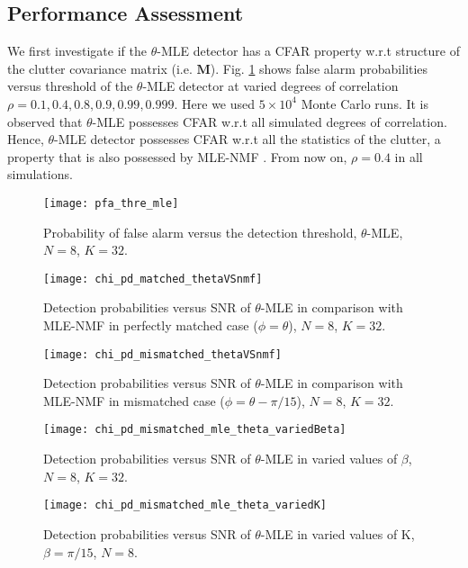 \subsection{Performance Assessment}
We first investigate if the $\theta$-MLE detector has a CFAR property
w.r.t structure of the clutter covariance matrix (i.e. $\boldsymbol{M}$).
Fig. \ref{pfa_thre_mle} shows false alarm probabilities versus threshold of
the $\theta$-MLE detector at varied degrees of correlation
$\rho = 0.1, 0.4, 0.8, 0.9, 0.99, 0.999$.
Here we used $5 \times 10^4$ Monte Carlo runs.
It is observed that $\theta$-MLE possesses CFAR w.r.t all simulated degrees of correlation.
Hence, $\theta$-MLE detector possesses CFAR w.r.t all the statistics of the clutter,
a property that is also possessed by MLE-NMF \cite{Conte_Aug02}.
From now on, $\rho = 0.4$ in all simulations.

 \begin{figure}
  \texttt{[image: pfa\_thre\_mle]}
  \caption{Probability of false alarm versus the detection threshold,
  $\theta$-MLE, $N = 8$, $K = 32$.}
  \label{pfa_thre_mle}
 \end{figure}


 \begin{figure}
  \texttt{[image: chi\_pd\_matched\_thetaVSnmf]}
  \caption{Detection probabilities versus SNR of $\theta$-MLE in comparison with MLE-NMF
   in perfectly matched case ($\phi = \theta$),
  $N = 8$, $K = 32$.}
  \label{pd_matched_thetaVSnmf}
 \end{figure}

  \begin{figure}
  \texttt{[image: chi\_pd\_mismatched\_thetaVSnmf]}
  \caption{Detection probabilities versus SNR of $\theta$-MLE in comparison with MLE-NMF
  in mismatched case ($\phi = \theta - \pi/15$), $N = 8$, $K = 32$.}
  \label{chi_pd_mismatched_thetaVSnmf}
 \end{figure}

  \begin{figure}
  \texttt{[image: chi\_pd\_mismatched\_mle\_theta\_variedBeta]}
  \caption{Detection probabilities versus SNR
  of $\theta$-MLE in varied values of $\beta$,
  $N = 8$, $K = 32$.}
  \label{chi_pd_mismatched_mle_theta_variedBeta}
   \end{figure}


  \begin{figure}
  \texttt{[image: chi\_pd\_mismatched\_mle\_theta\_variedK]}
  \caption{Detection probabilities versus SNR of $\theta$-MLE
  in varied values of K,
  $\beta = \pi/15$, $N = 8$.}
  \label{chi_pd_mismatched_scmAndmle_theta_variedK}
 \end{figure}

